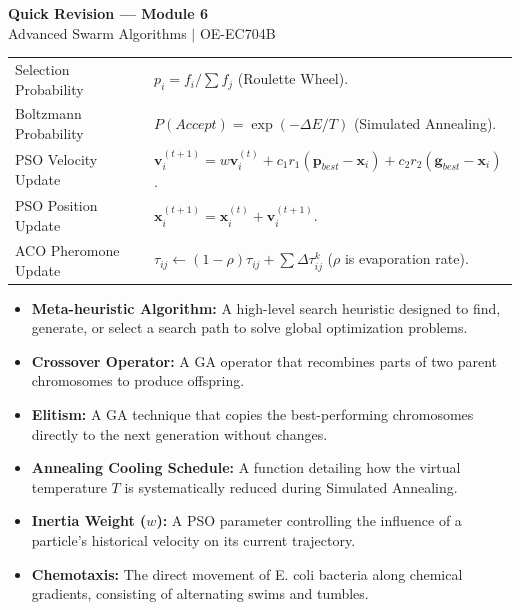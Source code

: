\documentclass[12pt,a4paper]{article}
\renewcommand{\arraystretch}{1.45}
\begin{document}
\newpage

\begin{center}
  {\large\bfseries\color{myred} Quick Revision --- Module 6}\\[3pt]
  {\small\color{mydark} Advanced Swarm Algorithms $|$ OE-EC704B}
\end{center}
\noindent{\color{myred}\rule{\linewidth}{1.2pt}}
\vspace{4pt}

\begin{tcolorbox}[formulabox, title={\textbf{Key Concepts \& Swarm Metrics}}]
\renewcommand{\arraystretch}{1.45}
\begin{tabularx}{\linewidth}{B{5.0cm} X}
Selection Probability & $p_i = f_i / \sum f_j$ \quad (Roulette Wheel). \\[4pt]
Boltzmann Probability & $P(Accept) = \exp(-\Delta E / T)$ \quad (Simulated Annealing). \\[4pt]
PSO Velocity Update & $\mathbf{v}_i^{(t+1)} = w \mathbf{v}_i^{(t)} + c_1 r_1 (\mathbf{p}_{best} - \mathbf{x}_i) + c_2 r_2 (\mathbf{g}_{best} - \mathbf{x}_i)$. \\[4pt]
PSO Position Update & $\mathbf{x}_i^{(t+1)} = \mathbf{x}_i^{(t)} + \mathbf{v}_i^{(t+1)}$. \\[4pt]
ACO Pheromone Update & $\tau_{ij} \leftarrow (1-\rho)\tau_{ij} + \sum \Delta \tau_{ij}^k$ \quad ($\rho$ is evaporation rate). \\
\end{tabularx}
\end{tcolorbox}

\begin{tcolorbox}[defbox, title={\textbf{One-Line Definitions}}]
\begin{itemize}[leftmargin=*, itemsep=2.5pt, topsep=0pt]
  \item \textbf{Meta-heuristic Algorithm:} A high-level search heuristic designed to find, generate, or select a search path to solve global optimization problems.
  \item \textbf{Crossover Operator:} A GA operator that recombines parts of two parent chromosomes to produce offspring.
  \item \textbf{Elitism:} A GA technique that copies the best-performing chromosomes directly to the next generation without changes.
  \item \textbf{Annealing Cooling Schedule:} A function detailing how the virtual temperature $T$ is systematically reduced during Simulated Annealing.
  \item \textbf{Inertia Weight ($w$):} A PSO parameter controlling the influence of a particle's historical velocity on its current trajectory.
  \item \textbf{Chemotaxis:} The direct movement of E. coli bacteria along chemical gradients, consisting of alternating swims and tumbles.
\end{itemize}
\end{tcolorbox}
\end{document}
